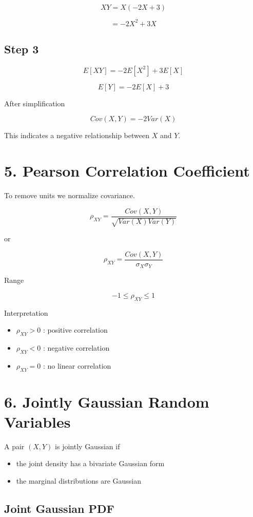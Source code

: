 \documentclass[12pt]{article}
\begin{document}
\[
XY=X(-2X+3)
\]

\[
=-2X^2+3X
\]

\subsection*{Step 3}

\[
E[XY]=-2E[X^2]+3E[X]
\]

\[
E[Y]=-2E[X]+3
\]

After simplification

\[
Cov(X,Y)=-2Var(X)
\]

This indicates a negative relationship between $X$ and $Y$.

\section*{5. Pearson Correlation Coefficient}

To remove units we normalize covariance.

\[
\rho_{XY}=\frac{Cov(X,Y)}{\sqrt{Var(X)Var(Y)}}
\]

or

\[
\rho_{XY}=\frac{Cov(X,Y)}{\sigma_X\sigma_Y}
\]

Range

\[
-1\le \rho_{XY}\le 1
\]

Interpretation

\begin{itemize}
\item $\rho_{XY}>0$ : positive correlation
\item $\rho_{XY}<0$ : negative correlation
\item $\rho_{XY}=0$ : no linear correlation
\end{itemize}

\section*{6. Jointly Gaussian Random Variables}

A pair $(X,Y)$ is jointly Gaussian if

\begin{itemize}
\item the joint density has a bivariate Gaussian form
\item the marginal distributions are Gaussian
\end{itemize}

\subsection*{Joint Gaussian PDF}
\end{document}
